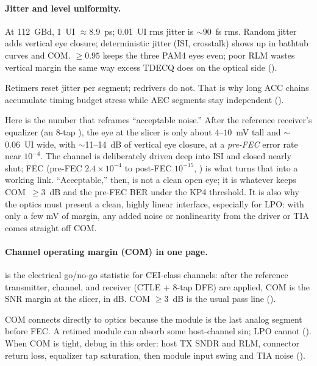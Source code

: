 \paragraph{Jitter and level uniformity.}
\label{sec:jitter}

At 112~GBd, 1~UI $\approx$8.9~ps; 0.01~UI rms jitter is $\sim$90~fs rms. Random
jitter adds vertical eye closure; deterministic jitter (ISI, crosstalk) shows up in
bathtub curves and COM.  $\ge0.95$ keeps the three PAM4 eyes
even; poor RLM wastes vertical margin the same way excess TDECQ does on the optical
side ().

Retimers reset jitter per segment; redrivers do not. That is why long ACC chains
accumulate timing budget stress while AEC segments stay independent
().

Here is the number that reframes ``acceptable noise.'' After the reference
receiver's equalizer (an 8-tap ), the eye at the slicer is only about
$4$--$10$~mV tall and $\sim$0.06~UI wide, with $\sim$11--14~dB of vertical eye
closure, at a \emph{pre-FEC} error rate near $10^{-4}$. The channel is deliberately
driven deep into ISI and closed nearly shut;  FEC (pre-FEC $2.4\times
10^{-4}$ to post-FEC $10^{-15}$, ) is what turns that into a working
link. ``Acceptable,'' then, is not a clean open eye; it is whatever keeps
COM~$\ge3$~dB and the pre-FEC BER under the KP4 threshold. It is also why the optics
must present a clean, highly linear interface, especially for LPO: with only a few
mV of margin, any added noise or nonlinearity from the driver or TIA comes straight
off COM.

\paragraph{Channel operating margin (COM) in one page.}
\label{sec:com}

 is the electrical go/no-go statistic for CEI-class channels: after the
reference transmitter, channel, and receiver (CTLE + 8-tap DFE) are applied, COM is
the SNR margin at the slicer, in dB. COM $\ge3$~dB is the usual pass line
().

COM connects directly to optics because the module is the last analog segment before
FEC. A retimed module can absorb some host-channel sin; LPO cannot
(). When COM is tight, debug in this order:
host TX SNDR and RLM, connector return loss, equalizer tap saturation, then module
input swing and TIA noise ().

